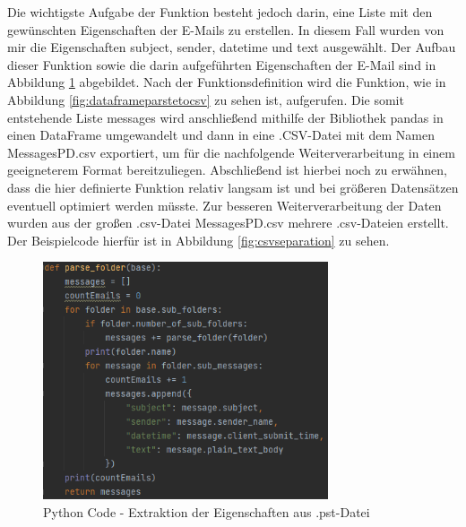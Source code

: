 \noindent Die wichtigste Aufgabe der Funktion besteht jedoch darin, eine Liste mit den gewünschten Eigenschaften der E-Mails zu erstellen. In diesem Fall wurden von mir die Eigenschaften \glqq{}subject\grqq{}, \glqq{}sender\grqq{}, \glqq{}datetime\grqq{} und \glqq{}text\grqq{} ausgewählt. Der Aufbau dieser Funktion sowie die darin aufgeführten Eigenschaften der E-Mail sind in Abbildung \ref{fig:extraction} abgebildet. Nach der Funktionsdefinition wird die Funktion, wie in Abbildung \ref{fig:dataframeparstetocsv} zu sehen ist, aufgerufen. Die somit entstehende Liste \glqq{}messages\grqq{} wird anschließend mithilfe der Bibliothek pandas in einen DataFrame umgewandelt und dann in eine .CSV-Datei mit dem Namen \glqq{}MessagesPD.csv\grqq{} exportiert, um für die nachfolgende Weiterverarbeitung in einem geeigneterem Format bereitzuliegen. Abschließend ist hierbei noch zu erwähnen, dass die hier definierte Funktion relativ langsam ist und bei größeren Datensätzen eventuell optimiert werden müsste. Zur besseren Weiterverarbeitung der Daten wurden aus der großen .csv-Datei \glqq{}MessagesPD.csv\grqq{} mehrere .csv-Dateien erstellt. Der Beispielcode hierfür ist in Abbildung \ref{fig:csvseparation} zu sehen.


\begin{figure}[!ht]
    \centering
    \includegraphics[width=0.75\textwidth]{images/Extraktion_aus_Pst_file.PNG}
    \caption{Python Code - Extraktion der Eigenschaften aus .pst-Datei} 
    \label{fig:extraction}
\end{figure}